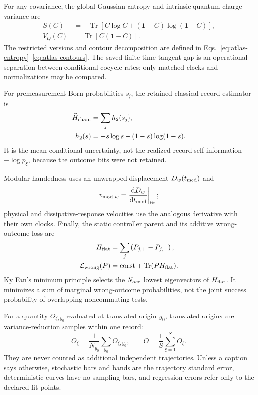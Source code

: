\documentclass[aps,prb,twocolumn,floatfix,nofootinbib,superscriptaddress]{revtex4-2}
\newcommand{\Tr}{\operatorname{Tr}}
\newcommand{\dd}{\mathrm{d}}
\begin{document}
For any covariance, the global Gaussian entropy and intrinsic quantum charge variance are
\begin{align}
 S(C)&=-\Tr\!\left[C\log C+(\mathbf{1}-C)\log(\mathbf{1}-C)\right],\nonumber\\
 V_Q(C)&=\Tr\!\left[C(\mathbf{1}-C)\right].
 \label{eq:purification}
\end{align}
The restricted versions and contour decomposition are defined in
Eqs.~\eqref{eq:atlas-entropy}--\eqref{eq:atlas-contours}.  The saved finite-time tangent
gap is an operational separation between conditional cocycle rates; only matched clocks
and normalizations may be compared.

For premeasurement Born probabilities $s_j$, the retained classical-record estimator is
\begin{equation}
 \begin{aligned}
 \widehat H_{\rm chain}&=\sum_jh_2(s_j),\\
 h_2(s)&=-s\log s-(1-s)\log(1-s).
 \end{aligned}
 \label{eq:record-entropy}
\end{equation}
It is the mean conditional uncertainty, not the realized-record self-information
$-\log p_\xi$, because the outcome bits were not retained.

Modular handedness uses an unwrapped displacement $D_w(t_{\rm mod})$ and
\begin{equation}
 v_{{\rm mod},w}=\left.\frac{\dd D_w}{\dd t_{\rm mod}}\right|_{\rm fit};
 \label{eq:modular-velocity}
\end{equation}
physical and dissipative-response velocities use the analogous derivative with their own
clocks.  Finally, the static controller parent and its additive wrong-outcome loss are
\begin{align}
 H_{\rm flat}&=\sum_j\left(P_{j,+}-P_{j,-}\right),
 \label{eq:flat-parent}\\
 \mathcal L_{\rm wrong}(P)&=\mathrm{const}+\Tr(PH_{\rm flat}).
 \label{eq:ky-fan-loss}
\end{align}
Ky Fan's minimum principle selects the $N_{\rm occ}$ lowest eigenvectors of
$H_{\rm flat}$.  It minimizes a sum of marginal wrong-outcome probabilities, not the
joint success probability of overlapping noncommuting tests.

For a quantity $O_{\xi,y_0}$ evaluated at translated origin $y_0$, translated origins are
variance-reduction samples within one record:
\begin{equation}
 O_\xi=\frac{1}{N_{y_0}}\sum_{y_0}O_{\xi,y_0},
 \qquad
 \overline O=\frac1S\sum_{\xi=1}^{S}O_\xi .
 \label{eq:trajectory-first-average}
\end{equation}
They are never counted as additional independent trajectories.  Unless a caption says
otherwise, stochastic bars and bands are the trajectory standard error, deterministic
curves have no sampling bars, and regression errors refer only to the declared fit points.
\end{document}
